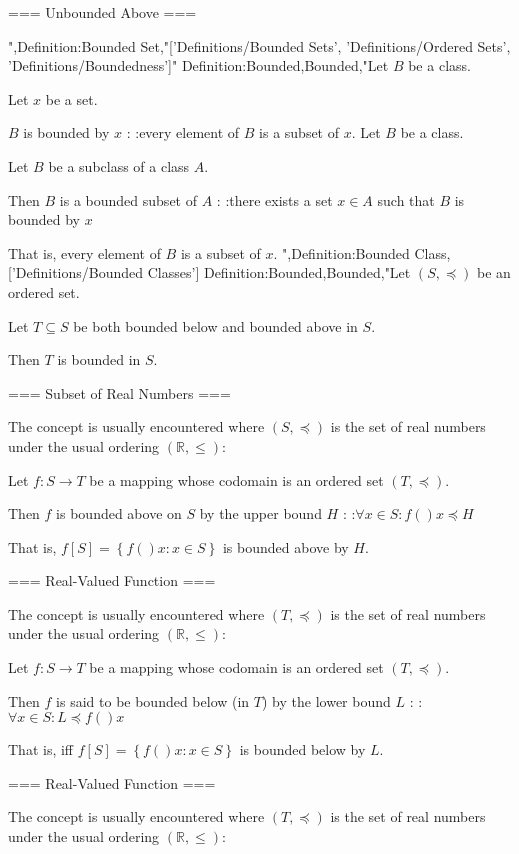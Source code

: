 === Unbounded Above ===

",Definition:Bounded Set,"['Definitions/Bounded Sets', 'Definitions/Ordered Sets', 'Definitions/Boundedness']"
Definition:Bounded,Bounded,"Let $B$ be a class.

Let $x$ be a set.

$B$ is bounded by $x$ :
:every element of $B$ is a subset of $x$.
Let $B$ be a class.

Let $B$ be a subclass of a class $A$.

Then $B$ is a bounded subset of $A$ :
:there exists a set $x \in A$ such that $B$ is bounded by $x$ 


That is,  every element of $B$ is a subset of $x$.
",Definition:Bounded Class,['Definitions/Bounded Classes']
Definition:Bounded,Bounded,"Let $\left( S, \preceq \right)$ be an ordered set.

Let $T \subseteq S$ be both bounded below and bounded above in $S$.


Then $T$ is bounded in $S$.


=== Subset of Real Numbers ===

The concept is usually encountered where $\left( S, \preceq \right)$ is the set of real numbers under the usual ordering $\left( \mathbb R, \le \right)$:


Let $f: S \to T$ be a mapping whose codomain is an ordered set $\left( T, \preceq \right)$.


Then $f$ is bounded above on $S$ by the upper bound $H$ :
:$\forall x \in S: f \left(   \right)x \preceq H$


That is,  $f \left[ S \right] = \left\lbrace f \left(   \right)x: x \in S \right\rbrace$ is bounded above by $H$.


=== Real-Valued Function ===

The concept is usually encountered where $\left( T, \preceq \right)$ is the set of real numbers under the usual ordering $\left( \mathbb R, \le \right)$:


Let $f: S \to T$ be a mapping whose codomain is an ordered set $\left( T, \preceq \right)$.


Then $f$ is said to be bounded below (in $T$) by the lower bound $L$ :
:$\forall x \in S: L \preceq f \left(   \right)x$


That is, iff $f \left[ S \right] = \left\lbrace f \left(   \right)x: x \in S \right\rbrace$ is bounded below by $L$.


=== Real-Valued Function ===

The concept is usually encountered where $\left( T, \preceq \right)$ is the set of real numbers under the usual ordering $\left( \mathbb R, \le \right)$:


